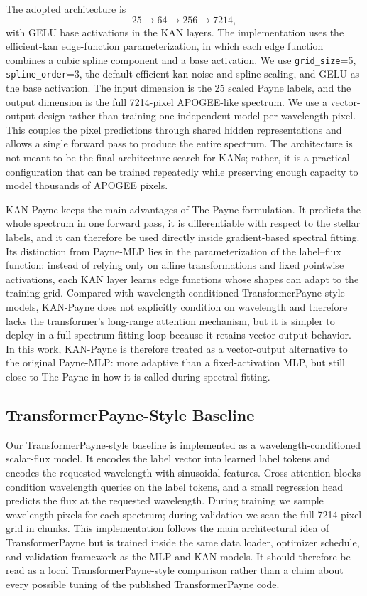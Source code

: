 \documentclass[universe,article,submit,pdftex,moreauthors]{Definitions/mdpi}
\begin{document}
The adopted architecture is
\begin{equation}
    \label{eq:kan-architecture}
    25 \rightarrow 64 \rightarrow 256 \rightarrow 7214 ,
\end{equation}
with GELU base activations in the KAN layers. The implementation uses the
efficient-kan edge-function parameterization, in which each edge
function combines a cubic spline component and a base activation. We use
\texttt{grid\_size}=5, \texttt{spline\_order}=3, the default
efficient-kan noise and spline scaling, and GELU as the base
activation. The input dimension is the
25 scaled Payne labels, and the output dimension is the full 7214-pixel
APOGEE-like spectrum. We use a vector-output design rather than training one
independent model per wavelength pixel. This couples the pixel predictions
through shared hidden representations and allows a single forward pass to
produce the entire spectrum. The architecture is not meant to be the final
architecture search for KANs; rather, it is a practical configuration that can
be trained repeatedly while preserving enough capacity to model thousands of
APOGEE pixels.

KAN-Payne keeps the main advantages of The Payne formulation. It predicts the
whole spectrum in one forward pass, it is differentiable with respect to the
stellar labels, and it can therefore be used directly inside gradient-based
spectral fitting. Its distinction from Payne-MLP lies in the parameterization of
the label--flux function: instead of relying only on affine transformations and
fixed pointwise activations, each KAN layer learns edge functions whose shapes
can adapt to the training grid.
Compared with wavelength-conditioned TransformerPayne-style models, KAN-Payne
does not explicitly condition on wavelength and therefore lacks the
transformer's long-range attention mechanism, but it is simpler to deploy in a
full-spectrum fitting loop because it retains vector-output behavior. In this
work, KAN-Payne is therefore treated as a vector-output alternative to the
original Payne-MLP: more adaptive than a fixed-activation MLP, but still close
to The Payne in how it is called during spectral fitting.

\subsection{TransformerPayne-Style Baseline}

Our TransformerPayne-style baseline is implemented as a wavelength-conditioned
scalar-flux model.
It encodes the label vector into learned label tokens and encodes the requested
wavelength with sinusoidal features. Cross-attention blocks condition wavelength
queries on the label tokens, and a small regression head predicts the flux at
the requested wavelength. During training we sample wavelength pixels for each
spectrum; during validation we scan the full 7214-pixel grid in chunks.
This implementation follows the main architectural idea of TransformerPayne
but is trained inside the same data loader, optimizer schedule, and validation
framework as the MLP and KAN models. It should therefore be read as a local
TransformerPayne-style comparison rather than a claim about every possible
tuning of the published TransformerPayne code.
\end{document}

